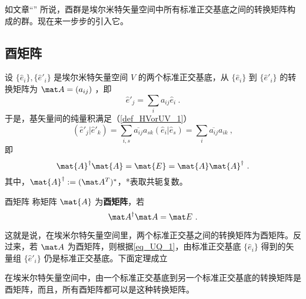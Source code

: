 
如文章“” 所说，酉群是埃尔米特矢量空间中所有标准正交基底之间的转换矩阵构成的群。现在来一步步的引入它。
\subsection{酉矩阵}
设 $\{ \hat e_i\},\{  \hat e'_i\}$ 是埃尔米特矢量空间 $V$ 的两个标准正交基底，从 $\{ \hat e_i\}$ 到 $\{\hat e'_i\}$ 的转换矩阵为 $\mat A=(a_{ij})$ ，即
\begin{equation}\label{eq_UQ_1}
   \hat e'_j=\sum_{i}a_{ij} \hat e_i~.
\end{equation}
于是，基矢量间的纯量积满足（\autoref{def_HVorUV_1}）
\begin{equation}
( \hat e'_j| \hat e'_k)=\sum_{i,s}\overline{a_{ij}}a_{sk}(\hat e_i|\hat e_s)=\sum_{i}\overline{a_{ij}}a_{ik}~,
\end{equation}
即
\begin{equation}\label{eq_UQ_2}
\mat{A}^\dagger \mat{A}=\mat{E}=\mat{A} \mat{A}^\dagger~.
\end{equation}
其中，$\mat{A}^\dagger:=(\mat A^T)^*$，*表取共轭复数。
\begin{definition}{酉矩阵}
称矩阵 $\mat{A}$ 为\textbf{酉矩阵}，若
\begin{equation}
\mat A^\dagger \mat A=\mat E~.
\end{equation}
\end{definition}
这就是说，在埃米尔特矢量空间里，两个标准正交基之间的转换矩阵为酉矩阵。反过来，若 $\mat A$ 为酉矩阵，则根据\autoref{eq_UQ_1}，由标准正交基底 $\{\hat e_i\}$ 得到的矢量组 $\{\hat e'_i\}$ 仍是标准正交基底。下面定理成立
\begin{theorem}{}
在埃米尔特矢量空间中，由一个标准正交基底到另一个标准正交基底的转换矩阵是酉矩阵，而且，所有酉矩阵都可以是这种转换矩阵。
\end{theorem}
